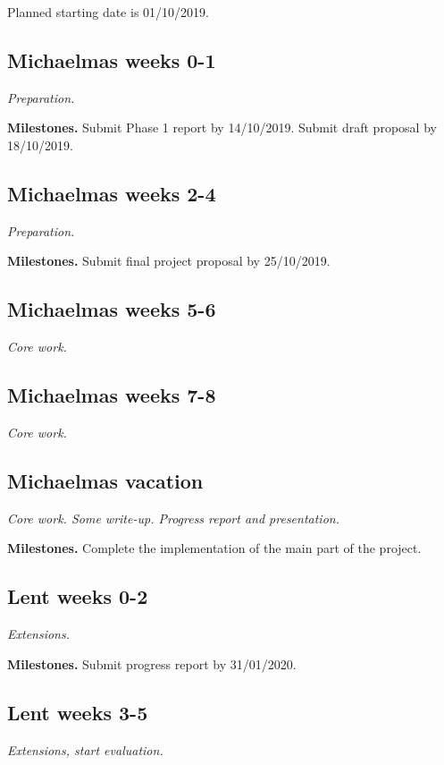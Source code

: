 \documentclass[12pt,a4paper,twoside]{article}
\begin{document}

Planned starting date is 01/10/2019.

\subsection*{Michaelmas weeks 0-1}
\textit{Preparation.}

\textbf{Milestones.} Submit Phase 1 report by 14/10/2019. Submit draft proposal by 18/10/2019.

\subsection*{Michaelmas weeks 2-4}
\textit{Preparation.}

\textbf{Milestones.} Submit final project proposal by 25/10/2019.

\subsection*{Michaelmas weeks 5-6}
\textit{Core work.}

\subsection*{Michaelmas weeks 7-8}
\textit{Core work.}

\subsection*{Michaelmas vacation}
\textit{Core work. Some write-up. Progress report and presentation.}

\textbf{Milestones.} Complete the implementation of the main part of the project.

\subsection*{Lent weeks 0-2}
\textit{Extensions.}
 
\textbf{Milestones.} Submit progress report by 31/01/2020.

\subsection*{Lent weeks 3-5} 
\textit{Extensions, start evaluation.}
\end{document}
